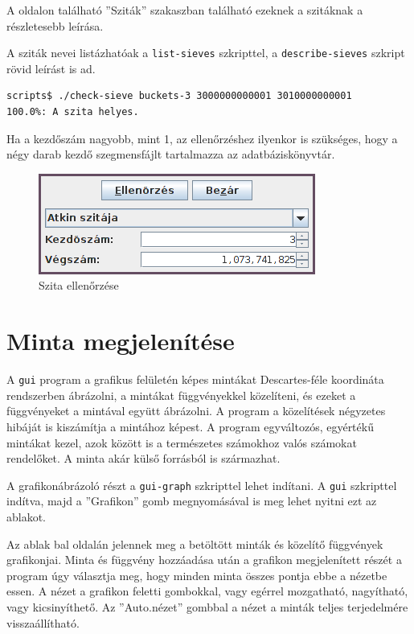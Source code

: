 A \pageref{sec:szitak} oldalon található ''Sziták'' szakaszban található ezeknek a szitáknak a részletesebb leírása.

A sziták nevei listázhatóak a \texttt{list-sieves} szkripttel, a \texttt{describe-sieves} szkript rövid leírást is ad.

\begin{lstlisting}[language=bash]
scripts$ ./check-sieve buckets-3 3000000000001 3010000000001
100.0%: A szita helyes.
\end{lstlisting}

Ha a kezdőszám nagyobb, mint 1, az ellenőrzéshez ilyenkor is szükséges, hogy a négy darab kezdő szegmensfájlt tartalmazza az adatbáziskönyvtár.

\begin{figure}[h]
\caption{Szita ellenőrzése}
\centering
\includegraphics[scale=1]{check-sieve.png}
\end{figure}

\section{Minta megjelenítése}

A \texttt{gui} program a grafikus felületén képes mintákat Descartes-féle koordináta rendszerben ábrázolni, a mintákat függvényekkel közelíteni, és ezeket a függvényeket a mintával együtt ábrázolni.
A program a közelítések négyzetes hibáját is kiszámítja a mintához képest.
A program egyváltozós, egyértékű mintákat kezel, azok között is a természetes számokhoz valós számokat rendelőket.
A minta akár külső forrásból is származhat.

A grafikonábrázoló részt a \texttt{gui-graph} szkripttel lehet indítani. A \texttt{gui} szkripttel indítva, majd a ''Grafikon'' gomb megnyomásával is meg lehet nyitni ezt az ablakot.

Az ablak bal oldalán jelennek meg a betöltött minták és közelítő függvények grafikonjai.
Minta és függvény hozzáadása után a grafikon megjelenített részét a program úgy választja meg, hogy minden minta összes pontja ebbe a nézetbe essen.
A nézet a grafikon feletti gombokkal, vagy egérrel mozgatható, nagyítható, vagy kicsinyíthető.
Az ''Auto.nézet'' gombbal a nézet a minták teljes terjedelmére visszaállítható.

